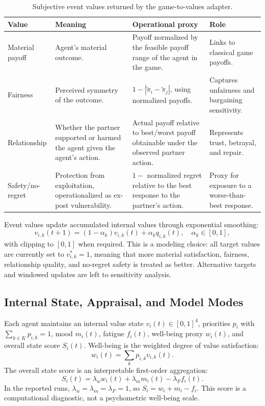 \documentclass[runningheads]{llncs}
\begin{document}
\begin{table}[t]
\centering
\caption{Subjective event values returned by the game-to-values adapter.}
\label{tab:values}
\scriptsize
\begin{tabular}{p{.20\linewidth}p{.24\linewidth}p{.31\linewidth}p{.17\linewidth}}
\toprule
Value & Meaning & Operational proxy & Role \\
\midrule
Material payoff & Agent's material outcome. & Payoff normalized by the feasible payoff range of the agent in the game. & Links to classical game payoffs. \\
Fairness & Perceived symmetry of the outcome. & $1-|\tilde\pi_i-\tilde\pi_j|$, using normalized payoffs. & Captures unfairness and bargaining sensitivity. \\
Relationship & Whether the partner supported or harmed the agent given the agent's action. & Actual payoff relative to best/worst payoff obtainable under the observed partner action. & Represents trust, betrayal, and repair. \\
Safety/no-regret & Protection from exploitation, operationalized as ex-post vulnerability. & $1-$ normalized regret relative to the best response to the partner's action. & Proxy for exposure to a worse-than-best response. \\
\bottomrule
\end{tabular}
\end{table}

Event values update accumulated internal values through exponential smoothing:
\[
v_{i,k}(t+1)=(1-\alpha_k)v_{i,k}(t)+\alpha_k q_{i,k}(t),\quad \alpha_k\in[0,1],
\]
with clipping to $[0,1]$ when required. This is a modeling choice: all target values are currently set to $v^*_{i,k}=1$, meaning that more material satisfaction, fairness, relationship quality, and no-regret safety is treated as better. Alternative targets and windowed updates are left to sensitivity analysis.

\subsection{Internal State, Appraisal, and Model Modes}
Each agent maintains an internal value state $v_i(t)\in[0,1]^4$, priorities $p_i$ with $\sum_{k\in K} p_{i,k}=1$, mood $m_i(t)$, fatigue $f_i(t)$, well-being proxy $w_i(t)$, and overall state score $S_i(t)$. Well-being is the weighted degree of value satisfaction:
\[
w_i(t)=\sum_k p_{i,k}v_{i,k}(t).
\]
The overall state score is an interpretable first-order aggregation:
\[
S_i(t)=\lambda_w w_i(t)+\lambda_m m_i(t)-\lambda_F f_i(t).
\]
In the reported runs, $\lambda_w=\lambda_m=\lambda_F=1$, so $S_i=w_i+m_i-f_i$. This score is a computational diagnostic, not a psychometric well-being scale.
\end{document}
